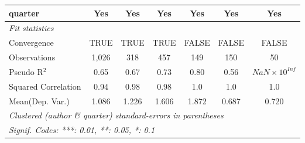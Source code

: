 \begin{tabular}{lcccccc}
   quarter                                                    & Yes           & Yes         & Yes         & Yes           & Yes          & Yes\\  
   \midrule
   \emph{Fit statistics}\\
   Convergence                                                &TRUE           & TRUE        & TRUE        & FALSE         & FALSE        & FALSE\\  
   Observations                                               & 1,026         & 318         & 457         & 149           & 150          & 50\\  
   Pseudo R$^2$                                               & 0.65          & 0.67        & 0.73        & 0.80          & 0.56         & $NaN\times 10^{Inf}$\\   
   Squared Correlation                                        & 0.94          & 0.98        & 0.98        & 1.0           & 1.0          & 1.0\\  
Mean(Dep. Var.) & 1.086 & 1.226 & 1.606 & 1.872 & 0.687 & 0.720 \\
   \midrule \midrule
   \multicolumn{7}{l}{\emph{Clustered (author \& quarter) standard-errors in parentheses}}\\
   \multicolumn{7}{l}{\emph{Signif. Codes: ***: 0.01, **: 0.05, *: 0.1}}\\
\end{tabular}
\par\endgroup
